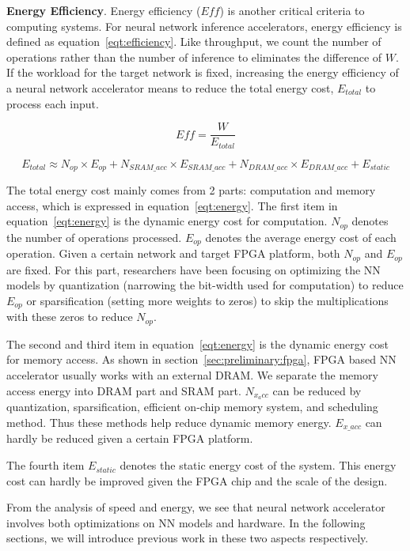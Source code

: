 {\textbf{Energy Efficiency}. Energy efficiency ($Eff$) is another critical criteria to computing systems. For neural network inference accelerators, energy efficiency is defined as equation~\ref{eqt:efficiency}. Like throughput, we count the number of operations rather than the number of inference to eliminates the difference of $W$. If the workload for the target network is fixed, increasing the energy efficiency of a neural network accelerator means to reduce the total energy cost, $E_{total}$ to process each input.

\begin{equation}\label{eqt:efficiency}
    Eff = \frac{W}{E_{total}}
\end{equation}
    
\begin{equation}\label{eqt:energy}
    E_{total} \approx N_{op}\times E_{op} + N_{SRAM\_acc}\times E_{SRAM\_acc} + N_{DRAM\_acc}\times E_{DRAM\_acc} + E_{static}
\end{equation}

The total energy cost mainly comes from 2 parts: computation and memory access, which is expressed in equation~\ref{eqt:energy}. The first item in equation~\ref{eqt:energy} is the dynamic energy cost for computation. $N_{op}$ denotes the number of operations processed. $E_{op}$ denotes the average energy cost of each operation. Given a certain network and target FPGA platform, both $N_{op}$ and $E_{op}$ are fixed. For this part, researchers have been focusing on optimizing the NN models by quantization (narrowing the bit-width used for computation) to reduce $E_{op}$ or sparsification (setting more weights to zeros) to skip the multiplications with these zeros to reduce $N_{op}$.

The second and third item in equation~\ref{eqt:energy} is the dynamic energy cost for memory access. As shown in section~\ref{sec:preliminary:fpga}, FPGA based NN accelerator usually works with an external DRAM. We separate the memory access energy into DRAM part and SRAM part. $N_{x_acc}$ can be reduced by quantization, sparsification, efficient on-chip memory system, and scheduling method. Thus these methods help reduce dynamic memory energy. $E_{x\_acc}$ can hardly be reduced given a certain FPGA platform.}

The fourth item $E_{static}$ denotes the static energy cost of the system. This energy cost can hardly be improved given the FPGA chip and the scale of the design.

From the analysis of speed and energy, we see that neural network accelerator involves both optimizations on NN models and hardware. In the following sections, we will introduce previous work in these two aspects respectively.
